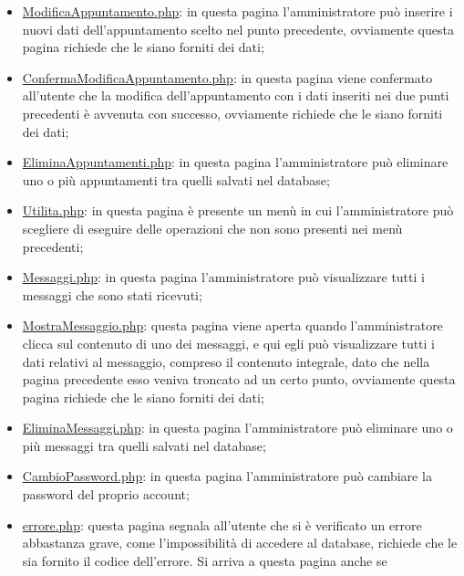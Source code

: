 {\begin{itemize}
		\item \underline{ModificaAppuntamento.php}: in questa pagina l'amministratore può inserire i nuovi dati dell'appuntamento scelto nel punto precedente, ovviamente questa pagina richiede che le siano forniti dei dati;
		\item \underline{ConfermaModificaAppuntamento.php}: in questa pagina viene confermato all'utente che la modifica dell'appuntamento con i dati inseriti nei due punti precedenti è avvenuta con successo, ovviamente richiede che le siano forniti dei dati;
		\item \href{http://tecweb2016.studenti.math.unipd.it/smarches/EliminaAppuntamenti.php}{EliminaAppuntamenti.php}: in questa pagina l'amministratore può eliminare uno o più appuntamenti tra quelli salvati nel database;
		\item \href{http://tecweb2016.studenti.math.unipd.it/smarches/Utilita.php}{Utilita.php}: in questa pagina è presente un menù in cui l'amministratore può scegliere di eseguire delle operazioni che non sono presenti nei menù precedenti;
		\item \href{http://tecweb2016.studenti.math.unipd.it/smarches/Messaggi.php}{Messaggi.php}: in questa pagina l'amministratore può visualizzare tutti i messaggi che sono stati ricevuti;
		\item \underline{MostraMessaggio.php}: questa pagina viene aperta quando l'amministratore clicca sul contenuto di uno dei messaggi, e qui egli può visualizzare tutti i dati relativi al messaggio, compreso il contenuto integrale, dato che nella pagina precedente esso veniva troncato ad un certo punto, ovviamente questa pagina richiede che le siano forniti dei dati;
		\item \href{http://tecweb2016.studenti.math.unipd.it/smarches/EliminaMessaggi.php}{EliminaMessaggi.php}: in questa pagina l'amministratore può eliminare uno o più messaggi tra quelli salvati nel database;
		\item \href{http://tecweb2016.studenti.math.unipd.it/smarches/CambioPassword.php}{CambioPassword.php}: in questa pagina l'amministratore può cambiare la password del proprio account;
		\item \underline{errore.php}: questa pagina segnala all'utente che si è verificato un errore abbastanza grave, come l'impossibilità di accedere al database, richiede che le sia fornito il codice dell'errore. Si arriva a questa pagina anche se 
	\end{itemize}
}